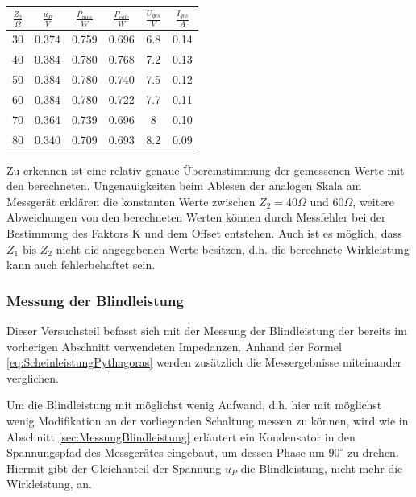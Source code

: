 \begin{large}
\begin{center}
\begin{tabular}{| c | c | c | c | c | c |}
\hline
$\frac{Z_2}{\Omega}$ & $\frac{\overline{u_P}}{V}$ 
& $\frac{P_{mes}}{W}$ & $\frac{P_{calc}}{W}$ & $\frac{U_{ges}}{V}$ & $\frac{I_{ges}}{A}$\\
\hline

30 & 0.374 & 0.759 & 0.696 & 6.8 & 0.14 \\
40 & 0.384 & 0.780 & 0.768 & 7.2 & 0.13 \\
50 & 0.384 & 0.780 & 0.740 & 7.5 & 0.12 \\
60 & 0.384 & 0.780 & 0.722 & 7.7 & 0.11 \\
70 & 0.364 & 0.739 & 0.696 & 8   & 0.10 \\
80 & 0.340 & 0.709 & 0.693 & 8.2 & 0.09 \\
\hline
\end{tabular}
\end{center}
\end{large}

Zu erkennen ist eine relativ genaue Übereinstimmung der gemessenen Werte mit den berechneten. Ungenauigkeiten beim Ablesen der analogen Skala am Messgerät erklären die konstanten Werte zwischen $Z_2 = 40\Omega$ und $60\Omega$, weitere Abweichungen von den berechneten Werten können durch Messfehler bei der Bestimmung des Faktors K und dem Offset entstehen. Auch ist es möglich, dass $Z_1 \mbox{ bis } Z_2$ nicht die angegebenen Werte besitzen, d.h. die berechnete Wirkleistung kann auch fehlerbehaftet sein.

\subsubsection{Messung der Blindleistung}
Dieser Versuchsteil befasst sich mit der Messung der Blindleistung der bereits im vorherigen Abschnitt verwendeten Impedanzen. Anhand der Formel \eqref{eq:ScheinleistungPythagoras} werden zusätzlich die Messergebnisse miteinander verglichen.

Um die Blindleistung mit möglichst wenig Aufwand, d.h. hier mit möglichst wenig Modifikation an der vorliegenden Schaltung messen zu können, wird wie in Abschnitt \ref{sec:MessungBlindleistung} erläutert ein Kondensator in den Spannungspfad des Messgerätes eingebaut, um dessen Phase um $90^\circ$ zu drehen. Hiermit gibt der Gleichanteil der Spannung $u_P$ die Blindleistung, nicht mehr die Wirkleistung, an.

